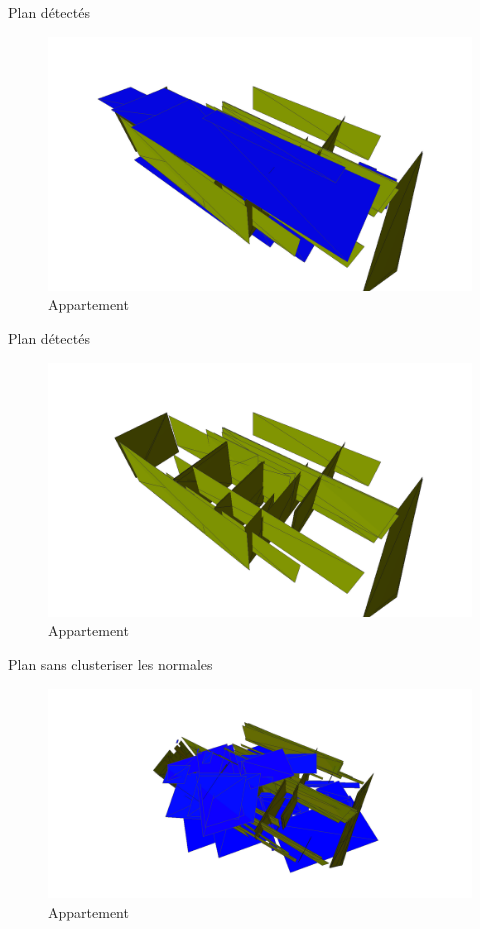 \documentclass[11pt]{beamer}
\begin{document}
\begin{frame}{Plan détectés}
\begin{figure}[hbtp]
\centering
\includegraphics[width=\columnwidth]{appart06.png}
\caption{Appartement}
\end{figure}
\end{frame}
\begin{frame}{Plan détectés}
\begin{figure}[hbtp]
\centering
\includegraphics[width=\columnwidth]{appart05.png}
\caption{Appartement}
\end{figure}
\end{frame}

\begin{frame}{Plan sans clusteriser les normales}
\begin{figure}[hbtp]
\centering
\includegraphics[width=\columnwidth]{appart00.png}
\caption{Appartement}
\end{figure}
\end{frame}


%
%

\end{document}
